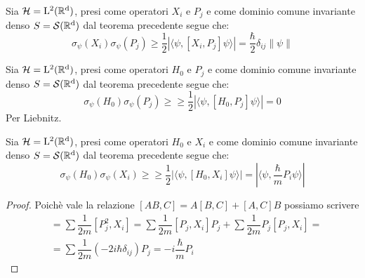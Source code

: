 \begin{corollary}
    Sia $\operatorname{\mathcal{H}} = \operatorname{L^2(\mathbb{R}^d)}$, presi come operatori $X_i$ e $P_j$ e come dominio comune invariante denso $S= \operatorname{\mathcal{S}(\mathbb{R}^d)}$ dal teorema precedente segue che: 
    $$ \sigma_\psi(X_i)\sigma_\psi (P_j) \geq \dfrac{1}{2} |\langle \psi, [X_i, P_j] \psi \rangle| = \dfrac{\hbar}{2} \delta_{ij} \|\psi \|$$
\end{corollary}


\begin{corollary}
        Sia $\operatorname{\mathcal{H}} = \operatorname{L^2(\mathbb{R}^d)}$, presi come operatori $H_0$ e $P_j$ e come dominio comune invariante denso $S= \operatorname{\mathcal{S}(\mathbb{R}^d)}$ dal teorema precedente segue che: 
$$\sigma_\psi(H_0)\sigma_\psi (P_j) \geq \geq \dfrac{1}{2} |\langle \psi, [H_0, P_j] \psi \rangle|=0$$ Per Liebnitz. 
\end{corollary}

\begin{corollary}
    Sia $\operatorname{\mathcal{H}} = \operatorname{L^2(\mathbb{R}^d)}$, presi come operatori $H_0$ e $X_i$ e come dominio comune invariante denso $S= \operatorname{\mathcal{S}(\mathbb{R}^d)}$ dal teorema precedente segue che:
$$\sigma_\psi(H_0)\sigma_\psi (X_i) \geq \geq \dfrac{1}{2} |\langle \psi, [H_0, X_i] \psi \rangle|= |\langle \psi, \dfrac{\hbar}{m} P_i \psi \rangle|$$
\end{corollary}

\begin{proof}
    Poichè vale la relazione $[AB,C]= A[B,C]+[A,C]B$ possiamo scrivere 
\begin{align*}
[H_0, X_i] &=\sum \dfrac{1}{2m} [P_j^2, X_i] = \sum \dfrac{1}{2m} [P_j, X_i]P_j + \sum \dfrac{1}{2m} P_j [P_j, X_i] = \\ 
&= \sum \dfrac{1}{2m}(-2i \hbar \delta_{ij})P_j = -i \dfrac{\hbar}{m} P_i
\end{align*}
\end{proof}

